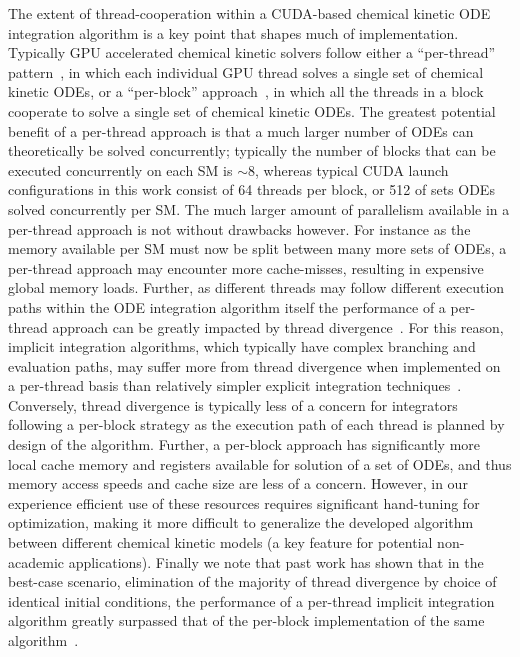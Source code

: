 \documentclass[final,twocolumn]{elsarticle}
\begin{document}
The extent of thread-cooperation within a CUDA-based chemical kinetic ODE integration algorithm is a key point that shapes much of implementation.
Typically GPU accelerated chemical kinetic solvers follow either a ``per-thread'' pattern~\cite{Niemeyer:2011aa,Stone:2013aa,Niemeyer:2014aa}, in which each individual GPU thread solves a single set of chemical kinetic ODEs, or a ``per-block'' approach~\cite{Stone:2013aa,Sewerin20151375}, in which all the threads in a block cooperate to solve a single set of chemical kinetic ODEs.
The greatest potential benefit of a per-thread approach is that a much larger number of ODEs can theoretically be solved concurrently; typically the number of blocks that can be executed concurrently on each SM is $\sim$8, whereas typical CUDA launch configurations in this work consist of 64 threads per block, or 512 of sets ODEs solved concurrently per SM.
The much larger amount of parallelism available in a per-thread approach is not without drawbacks however.
For instance as the memory available per SM must now be split between many more sets of ODEs, a per-thread approach may encounter more cache-misses, resulting in expensive global memory loads.
Further, as different threads may follow different execution paths within the ODE integration algorithm itself the performance of a per-thread approach can be greatly impacted by thread divergence~\cite{Stone:2013aa,Niemeyer:2014aa}.
For this reason, implicit integration algorithms, which typically have complex branching and evaluation paths, may suffer more from thread divergence when implemented on a per-thread basis than relatively simpler explicit integration techniques~\cite{Stone:2013aa}.
Conversely, thread divergence is typically less of a concern for integrators following a per-block strategy as the execution path of each thread is planned by design of the algorithm.
Further, a per-block approach has significantly more local cache memory and registers available for solution of a set of ODEs, and thus memory access speeds and cache size are less of a concern.
However, in our experience efficient use of these resources requires significant hand-tuning for optimization, making it more difficult to generalize the developed algorithm between different chemical kinetic models (a key feature for potential non-academic applications).
Finally we note that past work has shown that in the best-case scenario, elimination of the majority of thread divergence by choice of identical initial conditions, the performance of a per-thread implicit integration algorithm greatly surpassed that of the per-block implementation of the same algorithm~\cite{Stone:2013aa}.
\end{document}
